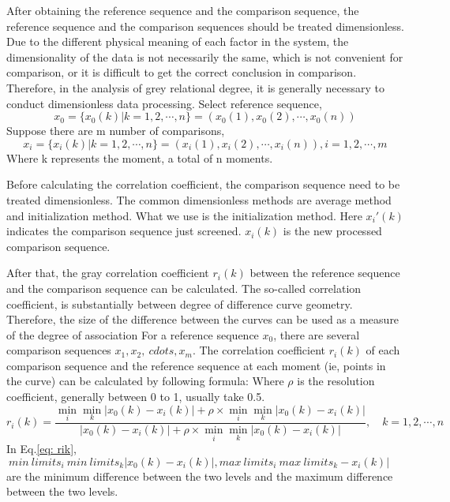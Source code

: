 \documentclass{mcmthesis}
\begin{document}
After obtaining the reference sequence and the comparison sequence, the reference sequence and the comparison sequences should be treated dimensionless.
Due to the different physical meaning of each factor in the system, the dimensionality of the data is not necessarily the same, which is not convenient for comparison, or it is difficult to get the correct conclusion in comparison. Therefore, in the analysis of grey relational degree, it is generally necessary to conduct dimensionless data processing.
\newline
Select reference sequence,
\begin{equation}
  x_0 = \{x_0(k) | k=1,2,\cdots,n \} = (x_0(1), x_0(2), \cdots, x_0(n))
\end{equation}
Suppose there are m number of comparisons,
\begin{equation}
x_i = \{x_i(k) | k=1,2,\cdots,n\} = (x_i(1), x_i(2), \cdots, x_i(n)), i = 1,2,\cdots,m 
\end{equation}
Where k represents the moment, a total of n moments.

Before calculating the correlation coefficient, the comparison sequence need to be treated dimensionless. The common dimensionless methods are average method and initialization method.
What we use is the initialization method.
Here $ x_i '(k) $ indicates the comparison sequence just screened. $ x_i (k) $ is the new processed comparison sequence.

After that, the gray correlation coefficient $r_i(k)$ between the reference sequence and the comparison sequence can be calculated.
The so-called correlation coefficient, is substantially between degree of difference curve geometry. Therefore, the size of the difference between the curves can be used as a measure of the degree of association
For a reference sequence $ x_0 $, there are several comparison sequences $ x_1, x_2, \ cdots, x_m $. The correlation coefficient $ r_i (k) $ of each comparison sequence and the reference sequence at each moment (ie, points in the curve) can be calculated by following formula: Where $\rho$ is the resolution coefficient, generally between 0 to 1, usually take 0.5.
\begin{equation}
  r_i(k) = \frac{\min\limits_{i} \min\limits_{k}| x_0(k) - x_i(k)| + \rho \times \min\limits_{i} \min\limits_{k}| x_0(k) - x_i(k)|}{|x_0(k) - x_i(k)| + \rho \times \min\limits_{i} \min\limits_{k}| x_0(k) - x_i(k)|},\quad k=1,2,\cdots,n
  \label{eq: rik}
\end{equation}
In Eq.\ref{eq: rik}, $ \ min \ limits_ {i} \ min \ limits_ {k} | x_0 (k) - x_i (k) |, max \ limits_ {i} \ max \ limits_ {k} - x_i (k) | $ are the minimum difference between the two levels and the maximum difference between the two levels.
\end{document}
